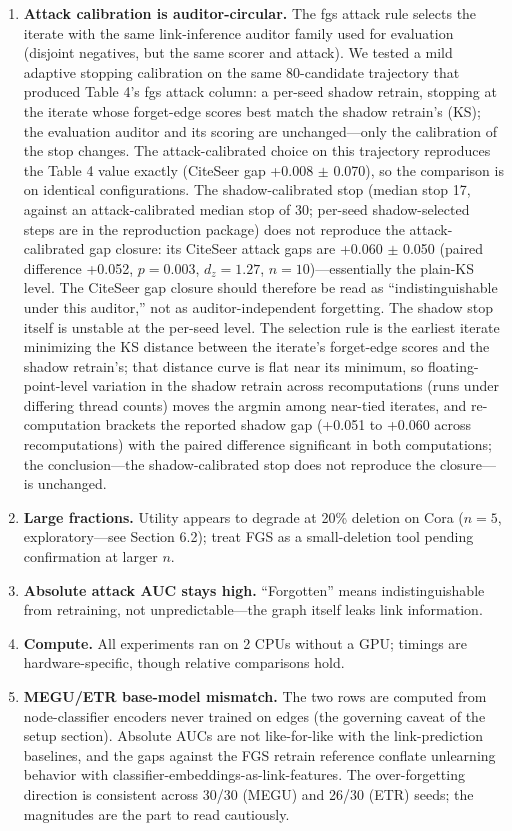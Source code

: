 \documentclass[pdflatex,sn-basic,Numbered]{sn-jnl}
\begin{document}
\begin{enumerate}
\item \textbf{Attack calibration is auditor-circular.} The fgs attack rule selects the iterate with the same link-inference auditor family used for evaluation (disjoint negatives, but the same scorer and attack). We tested a mild adaptive stopping calibration on the same 80-candidate trajectory that produced Table 4's fgs attack column: a per-seed shadow retrain, stopping at the iterate whose forget-edge scores best match the shadow retrain's (KS); the evaluation auditor and its scoring are unchanged---only the calibration of the stop changes. The attack-calibrated choice on this trajectory reproduces the Table 4 value exactly (CiteSeer gap +0.008 $\pm$ 0.070), so the comparison is on identical configurations. The shadow-calibrated stop (median stop 17, against an attack-calibrated median stop of 30; per-seed shadow-selected steps are in the reproduction package) does not reproduce the attack-calibrated gap closure: its CiteSeer attack gaps are +0.060 $\pm$ 0.050 (paired difference +0.052, $p = 0.003$, $d_z = 1.27$, $n = 10$)---essentially the plain-KS level. The CiteSeer gap closure should therefore be read as ``indistinguishable under this auditor,'' not as auditor-independent forgetting. The shadow stop itself is unstable at the per-seed level. The selection rule is the earliest iterate minimizing the KS distance between the iterate's forget-edge scores and the shadow retrain's; that distance curve is flat near its minimum, so floating-point-level variation in the shadow retrain across recomputations (runs under differing thread counts) moves the argmin among near-tied iterates, and re-computation brackets the reported shadow gap (+0.051 to +0.060 across recomputations) with the paired difference significant in both computations; the conclusion---the shadow-calibrated stop does not reproduce the closure---is unchanged.
\item \textbf{Large fractions.} Utility appears to degrade at 20\% deletion on Cora ($n = 5$, exploratory---see Section 6.2); treat FGS as a small-deletion tool pending confirmation at larger $n$.
\item \textbf{Absolute attack AUC stays high.} ``Forgotten'' means indistinguishable from retraining, not unpredictable---the graph itself leaks link information.
\item \textbf{Compute.} All experiments ran on 2 CPUs without a GPU; timings are hardware-specific, though relative comparisons hold.
\item \textbf{MEGU/ETR base-model mismatch.} The two rows are computed from node-classifier encoders never trained on edges (the governing caveat of the setup section). Absolute AUCs are not like-for-like with the link-prediction baselines, and the gaps against the FGS retrain reference conflate unlearning behavior with classifier-embeddings-as-link-features. The over-forgetting direction is consistent across 30/30 (MEGU) and 26/30 (ETR) seeds; the magnitudes are the part to read cautiously.

\end{enumerate}
\end{document}

